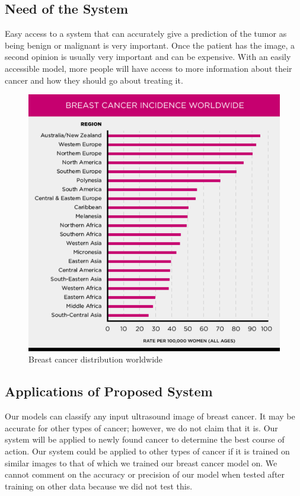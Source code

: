 \documentclass{article}
\begin{document}
\subsection{Need of the System}
Easy access to a system that can accurately give a prediction of the tumor as being benign or malignant is very important. Once the patient has the image, a second opinion is usually very important and can be expensive. With an easily accessible model, more people will have access to more information about their cancer and how they should go about treating it. 

\begin{figure}[htbp]
    \centering
    \caption{Breast cancer distribution worldwide}
    \includegraphics{pic1.png}
\end{figure}

\subsection{Applications of Proposed System}
Our models can classify any input ultrasound image of breast cancer. It may be accurate for other types of cancer; however, we do not claim that it is. Our system will be applied to newly found cancer to determine the best course of action. Our system could be applied to other types of cancer if it is trained on similar images to that of which we trained our breast cancer model on. We cannot comment on the accuracy or precision of our model when tested after training on other data because we did not test this.
\end{document}

